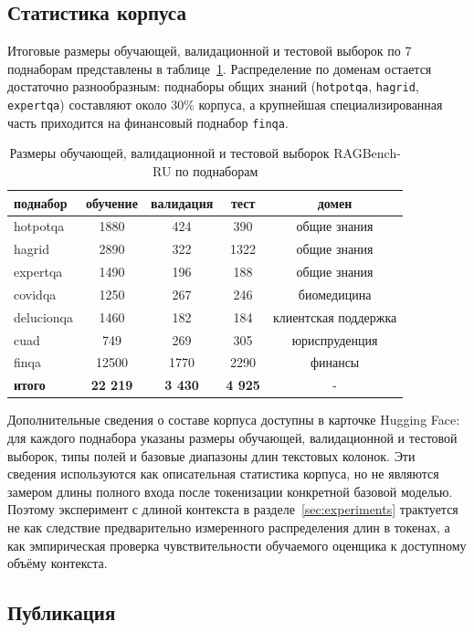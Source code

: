\subsection{Статистика корпуса}

Итоговые размеры обучающей, валидационной и тестовой выборок 
по 7 поднаборам представлены в
таблице~\ref{tab:dataset_stats}. Распределение по доменам остается достаточно
разнообразным: поднаборы общих знаний (\texttt{hotpotqa}, \texttt{hagrid},
\texttt{expertqa}) составляют около 30\% корпуса, а крупнейшая специализированная
часть приходится на финансовый поднабор \texttt{finqa}.

\begin{table}[H]
\centering
\small
\caption{Размеры обучающей, валидационной 
и тестовой выборок RAGBench-RU по поднаборам}
\label{tab:dataset_stats}
\begin{tabular}{lcccc}
\toprule
поднабор & обучение & валидация & тест & домен \\
\midrule
hotpotqa   & 1880 & 424 & 390 & общие знания \\
hagrid     & 2890 & 322 & 1322 & общие знания \\
expertqa   & 1490 & 196 & 188 & общие знания \\
covidqa    & 1250 & 267 & 246 & биомедицина \\
delucionqa & 1460 & 182 & 184 & клиентская поддержка \\
cuad       & 749 & 269 & 305 & юриспруденция \\
finqa      & 12500 & 1770 & 2290 & финансы \\
\midrule
\textbf{итого} & \textbf{22 219} & \textbf{3 430} & \textbf{4 925} & - \\
\bottomrule
\end{tabular}
\end{table}

Дополнительные сведения о составе корпуса доступны в карточке Hugging Face:
для каждого поднабора указаны размеры обучающей, валидационной и тестовой
выборок, типы полей и базовые диапазоны длин текстовых колонок. Эти сведения
используются как описательная статистика корпуса, но не являются замером длины
полного входа после токенизации конкретной базовой моделью. Поэтому эксперимент
с длиной контекста в разделе~\ref{sec:experiments} трактуется не как следствие
предварительно измеренного распределения длин в токенах, а как эмпирическая
проверка чувствительности обучаемого оценщика к доступному объёму контекста.


\subsection{Публикация}

